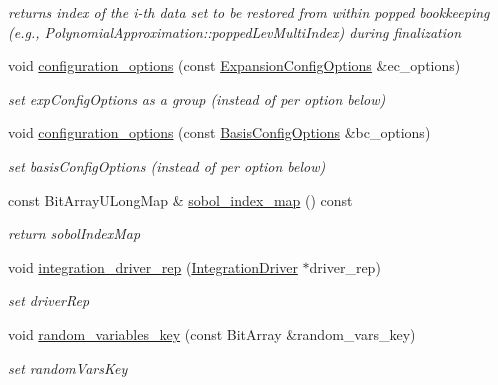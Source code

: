 \begin{DoxyCompactItemize}
\begin{DoxyCompactList}\small\item\em returns index of the i-\/th data set to be restored from within popped bookkeeping (e.\+g., Polynomial\+Approximation\+::popped\+Lev\+Multi\+Index) during finalization \end{DoxyCompactList}\item 
void \hyperlink{classPecos_1_1SharedPolyApproxData_a1d7741c20331ae1afc08dc406a6afe78}{configuration\+\_\+options} (const \hyperlink{classPecos_1_1ExpansionConfigOptions}{Expansion\+Config\+Options} \&ec\+\_\+options)\label{classPecos_1_1SharedPolyApproxData_a1d7741c20331ae1afc08dc406a6afe78}

\begin{DoxyCompactList}\small\item\em set exp\+Config\+Options as a group (instead of per option below) \end{DoxyCompactList}\item 
void \hyperlink{classPecos_1_1SharedPolyApproxData_a4605a939ee0abed5f5b7ec812977215f}{configuration\+\_\+options} (const \hyperlink{classPecos_1_1BasisConfigOptions}{Basis\+Config\+Options} \&bc\+\_\+options)\label{classPecos_1_1SharedPolyApproxData_a4605a939ee0abed5f5b7ec812977215f}

\begin{DoxyCompactList}\small\item\em set basis\+Config\+Options (instead of per option below) \end{DoxyCompactList}\item 
const Bit\+Array\+U\+Long\+Map \& \hyperlink{classPecos_1_1SharedPolyApproxData_a07c56e29872b88f5faa86d5da505bc29}{sobol\+\_\+index\+\_\+map} () const \label{classPecos_1_1SharedPolyApproxData_a07c56e29872b88f5faa86d5da505bc29}

\begin{DoxyCompactList}\small\item\em return sobol\+Index\+Map \end{DoxyCompactList}\item 
void \hyperlink{classPecos_1_1SharedPolyApproxData_ab8a9188f4270ae99ca400abbae1d5607}{integration\+\_\+driver\+\_\+rep} (\hyperlink{classPecos_1_1IntegrationDriver}{Integration\+Driver} $\ast$driver\+\_\+rep)\label{classPecos_1_1SharedPolyApproxData_ab8a9188f4270ae99ca400abbae1d5607}

\begin{DoxyCompactList}\small\item\em set driver\+Rep \end{DoxyCompactList}\item 
void \hyperlink{classPecos_1_1SharedPolyApproxData_a07148be97bf49d221dafdaf6d7dae415}{random\+\_\+variables\+\_\+key} (const Bit\+Array \&random\+\_\+vars\+\_\+key)\label{classPecos_1_1SharedPolyApproxData_a07148be97bf49d221dafdaf6d7dae415}

\begin{DoxyCompactList}\small\item\em set random\+Vars\+Key \end{DoxyCompactList}\end{DoxyCompactItemize}
